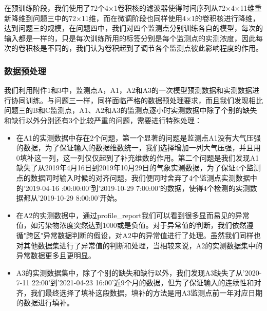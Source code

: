 \documentclass[bwprint]{gmcmthesis}
\numberwithin{figure}{section}
\begin{document}
在预训练阶段，我们使用了72个4×1卷积核的滤波器使得时间序列从72×4×11维重新降维到问题三中的72×11维，而在微调阶段也同样使用4×1的卷积核进行降维，达到问题三的规模，在问题四中，我们对四个监测点分别训练各自的模型，每次的输入都是一样的，只是每次训练所用的标签分别是每个监测点的实测浓度，因此每次的卷积核是不同的，我们认为卷积起到了调节各个监测点彼此影响程度的作用。
\subsubsection{数据预处理}
我们利用附件1和3中，监测点A，A1，A2和A3的一次模型预测数据和实测数据进行协同训练。与问题三一样，同样面临严格的数据预处理要求，而且我们发现相比问题三的B和C监测点，A1、A2和A3的监测点逐小时实测数据中除了个别的缺失和缺行以外分别还有3个比较严重的问题，需要进行特殊处理：
\begin{itemize}
	\item 在A1的实测数据中存在2个问题，第一个显著的问题是监测点A1没有大气压强的数据，为了保证输入的数据维数统一，我们选择增加一列大气压强，并且用0填补这一列，这一列仅仅起到了补充维数的作用。第二个问题是我们发现A1缺失了从2019年4月16日到2019年10月29日的气象实测数据，为了保证4个监测点的数据同时输入时候的对齐问题，我们便同时舍弃了4个监测点实测数据中的'2019-04-16 :00:00:00'到'2019-10-29 7:00:00'的数据，使得4个检测的实测数据都从'2019-10-29 8:00:00'开始。
	\item 在A2的实测数据中，通过profile_report我们可以看到很多显而易见的异常值，如污染物浓度突然达到1000或是负值。对于异常值的判断，我们依然遵循"跨区"异常数据判断的假设，对A2中的异常值进行了处理。虽然我们同样也对其他数据集进行了异常值的判断和处理，当相较来说，A2的实测数据集中的异常数据更多且更明显。
	\item A3的实测数据集中，除了个别的缺失和缺行以外，我们发现A3缺失了从'2020-7-11 22:00'到'2021-04-23 16:00'近9个月的数据，但为了保证输入的连续性和对齐，我们最终选择了填补这段数据，填补的方法是用A3监测点前一年对应日期的数据进行填补。
\end{itemize}
\end{document}
